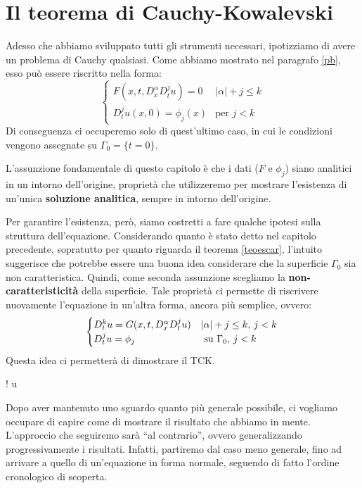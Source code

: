 \chapter{Il teorema di Cauchy-Kowalevski} \label{invariant}

Adesso che abbiamo sviluppato tutti gli strumenti necessari, ipotizziamo di avere un problema di Cauchy qualsiasi. Come abbiamo mostrato nel paragrafo \ref{pb}, esso può essere riscritto nella forma:
$$
\begin{cases}
F(x,t, D^\alpha_x D^j_t u)=0 & |\alpha | +j \leq k\\
D^j_t u (x,0)= \phi_j(x) & \text{per }j<k 
\end{cases}
$$
Di conseguenza ci occuperemo solo di quest'ultimo caso, in cui le condizioni vengono assegnate su $\Gamma_0=\{ t=0 \}$.

L'assunzione fondamentale di questo capitolo è che i dati ($F$ e $\phi_j$) siano analitici in un intorno dell'origine, proprietà che utilizzeremo per mostrare l'esistenza di un'unica \textbf{soluzione analitica}, sempre in intorno dell'origine.

Per garantire l'esistenza, però, siamo costretti a fare qualche ipotesi sulla struttura dell'equazione. 
Considerando quanto è stato detto nel capitolo precedente, sopratutto per quanto riguarda il teorema \ref{teoescar}, l'intuito suggerisce che potrebbe essere una buona idea considerare che la superficie $\Gamma_0$ sia non caratteristica. 
Quindi, come seconda assunzione scegliamo la \textbf{non-caratteristicità} della superficie. Tale proprietà ci permette di riscrivere nuovamente l'equazione in un'altra forma, ancora più semplice, ovvero:
\begin{equation}\label{pbnorm}
\begin{cases}
D_{t}^k u = G(x,t, D^\alpha_x D^j_t u) & |\alpha |+ j \leq k, \, j<k \\
D_t^ju = \phi_j & \text{ su } \Gamma_0, \, j<k
\end{cases} \\
\end{equation}
Questa idea ci permetterà di dimostrare il TCK.
\begin{namedtheorem}
{\exists ! \; u }
\end{namedtheorem}


Dopo aver mantenuto uno sguardo quanto più generale possibile, ci vogliamo occupare di capire come di mostrare il risultato che abbiamo in mente. L'approccio che seguiremo sarà ``al contrario'', ovvero generalizzando progressivamente i risultati. Infatti, partiremo dal caso meno generale, fino ad arrivare a quello di un'equazione in forma normale, seguendo di fatto l'ordine cronologico di scoperta.





